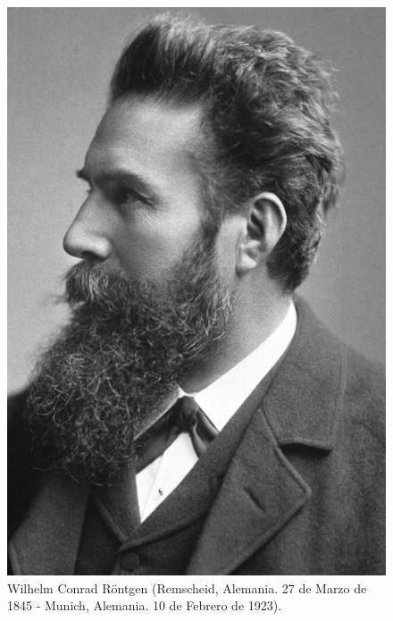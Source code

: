 \documentclass{beamer}
\begin{document}
\begin{darkframes}
\begin{frame}
        \begin{multicols}{2}
     \begin{figure}
         \centering
         \includegraphics[width = 0.85 \linewidth]{resources/3f.jpg}
         \caption{Wilhelm Conrad Röntgen (Remscheid, Alemania. 27 de Marzo de 1845 - Munich, Alemania. 10 de Febrero de 1923).}
         \label{fig:my_label}
     \end{figure}
     

\end{multicols}
\end{frame}
\end{darkframes}
\end{document}

